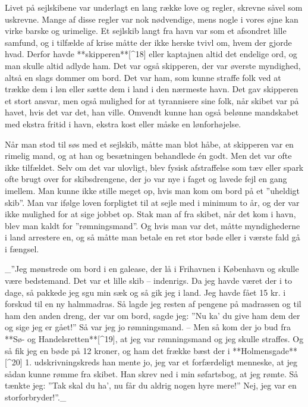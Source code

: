 \documentclass{book}
\begin{document}
Livet på sejlskibene var underlagt en lang række love og regler, skrevne såvel som
uskrevne. Mange af disse regler var nok nødvendige, mens nogle i vores øjne kan virke
barske og urimelige. Et sejlskib langt fra havn var som et afsondret lille samfund, og i
tilfælde af krise måtte der ikke herske tvivl om, hvem der gjorde hvad. Derfor havde
**skipperen**[^18] eller kaptajnen altid det endelige ord, og man skulle altid adlyde ham. Det var
også skipperen, der var øverste myndighed, altså en slags dommer om bord. Det var ham, som
kunne straffe folk ved at trække dem i løn eller sætte dem i land i den nærmeste havn. Det
gav skipperen et stort ansvar, men også mulighed for at tyrannisere sine folk, når skibet
var på havet, hvis det var det, han ville. Omvendt kunne han også belønne mandskabet med
ekstra fritid i havn, ekstra kost eller måske en lønforhøjelse.

Når man stod til søs med et sejlskib, måtte man blot håbe, at skipperen var en rimelig
mand, og at han og besætningen behandlede én godt. Men det var ofte ikke tilfældet. Selv
om det var ulovligt, blev fysisk afstraffelse som tæv eller spark ofte brugt over for
skibsdrengene, der jo var nye i faget og lavede fejl en gang imellem. Man kunne ikke
stille meget op, hvis man kom om bord på et ”uheldigt skib”. Man var ifølge loven
forpligtet til at sejle med i minimum to år, og der var ikke mulighed for at sige jobbet
op. Stak man af fra skibet, når det kom i havn, blev man kaldt for ”rømningsmand”. Og hvis
man var det, måtte myndighederne i land arrestere en, og så måtte man betale en ret stor
bøde eller i værste fald gå i fængsel.

 _”Jeg mønstrede om bord i en galease, der lå i Frihavnen i København og skulle være
bedstemand. Det var et lille skib – indenrigs. Da jeg havde været der i to dage, så
pakkede jeg sgu min sæk og så gik jeg i land. Jeg havde fået 15 kr. i forskud til en ny
halmmadras. Så lagde jeg resten af pengene på madrassen og til ham den anden dreng, der
var om bord, sagde jeg: ”Nu ka' du give ham dem der og sige jeg er gået!” Så var jeg jo
rømningsmand. – Men så kom der jo bud fra **Sø- og Handelsretten**[^19], at jeg var rømningsmand og
jeg skulle straffes. Og så fik jeg en bøde på 12 kroner, og ham det frække bæst der i
**Holmensgade**[^20] 1. udskrivningskreds han mente jo, jeg var et forfærdeligt menneske, at jeg
sådan kunne rømme fra skibet. Han skrev ned i min søfartsbog, at jeg rømte. Så tænkte jeg:
”Tak skal du ha', nu får du aldrig nogen hyre mere!” Nej, jeg var en storforbryder!”._
\end{document}
